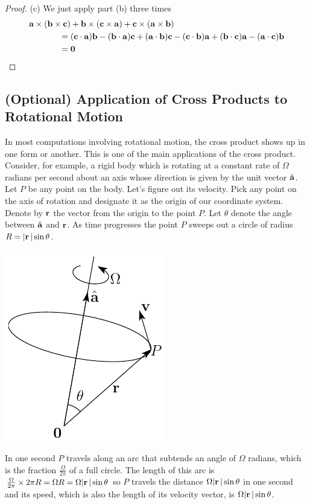 \begin{proof}
\noindent (c)
We just apply part (b) three times
\begin{align*}
          &\mathbf{a}\times(\mathbf{b}\times\mathbf{c}) + 
            \mathbf{b}\times(\mathbf{c}\times\mathbf{a}) +
            \mathbf{c}\times(\mathbf{a}\times\mathbf{b})  \\
&\hskip0.5in= (\mathbf{c}\cdot\mathbf{a})\mathbf{b}-(\mathbf{b}\cdot\mathbf{a})\mathbf{c}
            + (\mathbf{a}\cdot\mathbf{b})\mathbf{c}-(\mathbf{c}\cdot\mathbf{b})\mathbf{a}
            + (\mathbf{b}\cdot\mathbf{c})\mathbf{a}-(\mathbf{a}\cdot\mathbf{c})\mathbf{b} \\
&\hskip0.5in=\mathbf{0}            
\end{align*}
\end{proof}



\subsection{(Optional) Application of Cross Products to Rotational Motion}
\label{sec rot motion}
In most computations involving rotational motion, the cross product shows
up in one form or another. This is one of the main applications of the cross
product. Consider, for example, a rigid body which is rotating 
 at a constant rate of $\Omega$ radians per second about an axis 
whose direction is given by the unit vector $\hat{\mathbf{a}}$. Let $P$ be any point
on the body. Let's figure out its velocity. Pick any point on the axis
of rotation and designate it as the origin of our coordinate system. Denote
by $\mathbf{r}$ the vector from the origin to the point $P$. Let $\theta$ denote
the angle between $\hat{\mathbf{a}}$ and $\mathbf{r}$. As time progresses the point $P$
sweeps out a circle of radius $R=|\mathbf{r}\,|\sin\theta$.
      \begin{efig} 
      \begin{center}
      \includegraphics{rigid}
      \end{center}
      \end{efig}
In one second $P$ travels along an arc that subtends an angle of 
$\Omega$ radians, which is the fraction $\tfrac{\Omega}{2\pi}$ 
of a full circle.  The length of this arc is
$\tfrac{\Omega}{2\pi}\times 2\pi R=\Omega R=\Omega|\mathbf{r}\,|\sin\theta$ so $P$ travels the distance $\Omega|\mathbf{r}\,|\sin\theta$
in one second and its speed, which is also the length of its velocity vector,
is $\Omega|\mathbf{r}\,|\sin\theta$. 

